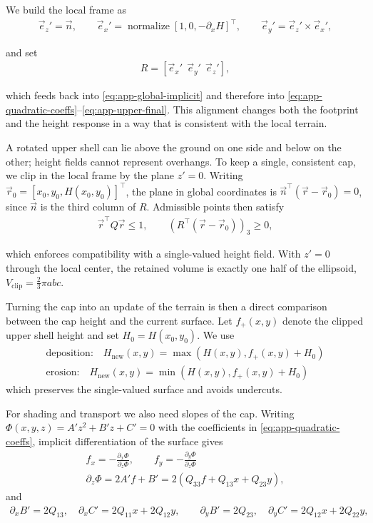 We build the local frame as
\begin{align}
    \vec e_z'=\vec n,
    \qquad
    \vec e_x'=\operatorname{normalize} [1,0,-\partial_x H]^\top ,
    \qquad
    \vec e_y'=\vec e_z'\times \vec e_x',
\end{align}

and set
\begin{align}
    \label{eq:app-rotation-from-normal}
    R=[ \vec e_x'\ \ \vec e_y'\ \ \vec e_z' ],
\end{align}

which feeds back into \cref{eq:app-global-implicit} and therefore into \cref{eq:app-quadratic-coeffs}–\cref{eq:app-upper-final}. This alignment changes both the footprint and the height response in a way that is consistent with the local terrain.

A rotated upper shell can lie above the ground on one side and below on the other; height fields cannot represent overhangs. To keep a single, consistent cap, we clip in the local frame by the plane $z'=0$. Writing $\vec r_0=[x_0,y_0,H(x_0,y_0)]^\top $, the plane in global coordinates is $\vec n^\top (\vec r-\vec r_0)=0$, since $\vec n$ is the third column of $R$. Admissible points then satisfy
\begin{align}
    \vec r^\top Q\vec r \le 1,
    \qquad
    \left(R^\top (\vec r-\vec r_0)\right)_3 \ge 0,
\end{align}

which enforces compatibility with a single-valued height field. With $z'=0$ through the local center, the retained volume is exactly one half of the ellipsoid, $V_{\text{clip}}=\tfrac{2}{3}\pi abc$.

Turning the cap into an update of the terrain is then a direct comparison between the cap height and the current surface. Let $f_{+}(x,y)$ denote the clipped upper shell height and set $H_0=H(x_0,y_0)$. We use
\begin{align}
    \text{deposition:} \quad H_{\text{new}}(x,y)=\max\left(H(x,y), f_{+}(x,y)+H_0\right) \\
    \text{erosion:}\quad H_{\text{new}}(x,y)=\min\left(H(x,y), f_{+}(x,y)+H_0\right)
\end{align}
which preserves the single-valued surface and avoids undercuts.

For shading and transport we also need slopes of the cap. Writing $\Phi(x,y,z)=A'z^2+B'z+C'=0$ with the coefficients in \cref{eq:app-quadratic-coeffs}, implicit differentiation of the surface gives
\begin{align}
    f_x=-\frac{\partial_x\Phi}{\partial_z\Phi},
    \qquad
    f_y=-\frac{\partial_y\Phi}{\partial_z\Phi} \\
    \partial_z\Phi=2A' f + B' = 2\left(Q_{33} f + Q_{13}x + Q_{23}y\right),
\end{align}
and
\begin{align}
    \partial_x B'=2Q_{13},\quad
    \partial_x C'=2Q_{11}x+2Q_{12}y,
    \qquad
    \partial_y B'=2Q_{23},\quad
    \partial_y C'=2Q_{12}x+2Q_{22}y,
\end{align}

